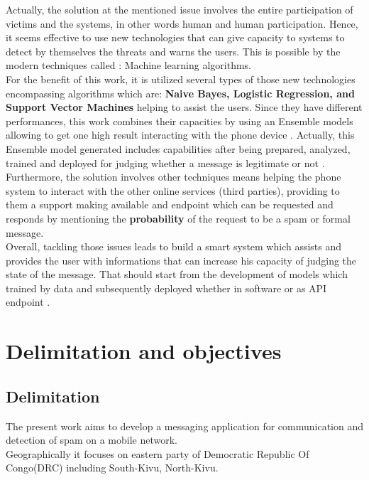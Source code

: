 \documentclass[12pt,a4paper, oneside]{book}
\begin{document}
	 Actually, the solution at the mentioned issue involves the entire participation of victims and the systems, in other words human and human participation. Hence, it seems effective to use new technologies that can give capacity to systems to detect by themselves the threats and warns the users. This is possible by the modern techniques called : Machine learning algorithms.\\
 
	 For the benefit of this work, it is utilized several types of those new technologies encompassing algorithms which are: \textbf{Naive Bayes, Logistic Regression, and Support Vector Machines} helping to assist the users. Since they have different performances, this work combines their capacities by using an Ensemble models allowing to get one high result interacting with the phone device \citep{raschka2017python}. Actually, this Ensemble model generated includes capabilities after being prepared, analyzed, trained and deployed for judging whether a message is legitimate or not \citep{karl1986model}. \\
	 	 
	 Furthermore, the solution involves other techniques means helping the phone system to interact with the other online services (third parties), providing to them a support making available and endpoint which can be requested and responds by mentioning the \textbf{probability} of the request to be a spam or formal message. \\
	 	 	 
	 Overall, tackling those issues leads to build a smart system which assists and provides the user with informations that can increase his capacity of judging the state of the message. That should start from the development of models which trained by data and subsequently deployed whether in software or as API endpoint
	 \citep{hadullo2021machine}.
	 	 
	\section{Delimitation and objectives}  
	\subsection{Delimitation}
	The present work aims to develop a messaging application for communication and detection of spam on a mobile network.
	\\
	Geographically it focuses on eastern party of Democratic Republic Of Congo(DRC) including South-Kivu, North-Kivu. \\
		
\end{document}

